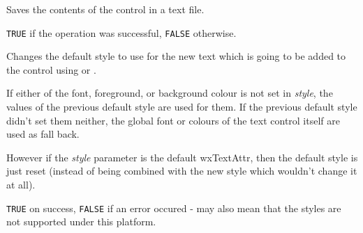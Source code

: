 



\label{wxtextctrlsavefile}


Saves the contents of the control in a text file.




{\tt TRUE} if the operation was successful, {\tt FALSE} otherwise.

\label{wxtextctrlsetdefaultstyle}


Changes the default style to use for the new text which is going to be added
to the control using  or\rtfsp
{}.

If either of the font, foreground, or background colour is not set in\rtfsp
{\it style}, the values of the previous default style are used for them. If
the previous default style didn't set them neither, the global font or colours
of the text control itself are used as fall back.

However if the {\it style} parameter is the default wxTextAttr, then the
default style is just reset (instead of being combined with the new style which
wouldn't change it at all).




{\tt TRUE} on success, {\tt FALSE} if an error occured - may also mean that
the styles are not supported under this platform.



\label{wxtextctrlseteditable}

